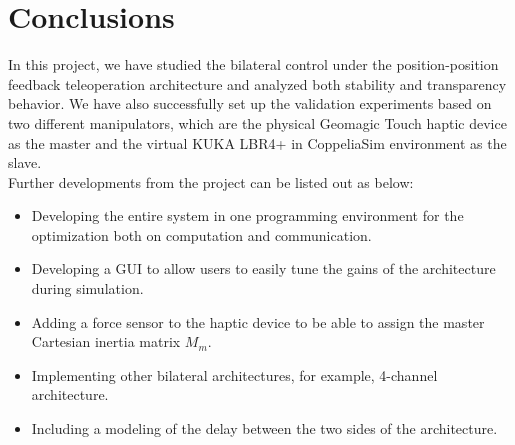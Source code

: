 \documentclass[main.tex]{subfiles}
\begin{document}
\section{Conclusions}
In this project, we have studied the bilateral control under the position-position feedback teleoperation architecture and analyzed both stability and transparency behavior. We have also successfully set up the validation experiments based on two different manipulators, which are the physical Geomagic Touch haptic device as the master and the virtual KUKA LBR4+ in CoppeliaSim environment as the slave.\\
Further developments from the project can be listed out as below:
\begin{itemize}
    \item Developing the entire system in one programming environment for the optimization both on computation and communication.
    \item Developing a GUI to allow users to easily tune the gains of the architecture during simulation.
    \item Adding a force sensor to the haptic device to be able to assign the master Cartesian inertia matrix $M_m$.
    \item Implementing other bilateral architectures, for example, 4-channel architecture.
    \item Including a modeling of the delay between the two sides of the architecture.
\end{itemize}
\end{document}
